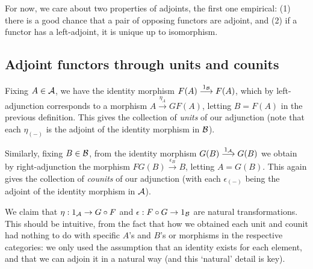 For now, we care about two properties of adjoints, the first one empirical: (1) there is a good chance that a pair of opposing functors are adjoint, and (2) if a functor has a left-adjoint, it is unique up to isomorphism.


\subsection{Adjoint functors through units and counits}
Fixing $A\in\mathcal{A}$, we have the identity morphism $F(A) \overset{1_{\mathcal{B}}}{\longrightarrow} F(A)$, which by left-adjunction corresponds to a morphism $A \overset{\eta_A}{\longrightarrow} GF(A)$, letting $B=F(A)$ in the previous definition. This gives the collection of \emph{units} of our adjunction (note that each $\eta_{(-)}$ is the adjoint of the identity morphism in $\mathcal{B}$).

Similarly, fixing $B\in\mathcal{B}$, from the identity morphism $G(B) \overset{1_{\mathcal{A}}}{\longrightarrow} G(B)$ we obtain by right-adjunction the morphism $FG(B) \overset{\epsilon_B}{\longrightarrow} B$, letting $A=G(B)$. This again gives the collection of \emph{counits} of our adjunction (with each $\epsilon_{(-)}$ being the adjoint of the identity morphism in $\mathcal{A}$).

We claim that $\eta : 1_{\mathcal{A}} \to G\circ F$ and $\epsilon : F\circ G \to 1_{\mathcal{B}}$ are natural transformations. This should be intuitive, from the fact that how we obtained each unit and counit had nothing to do with specific $A$'s and $B$'s or morphisms in the respective categories: we only used the assumption that an identity exists for each element, and that we can adjoin it in a natural way (and this `natural' detail is key).

